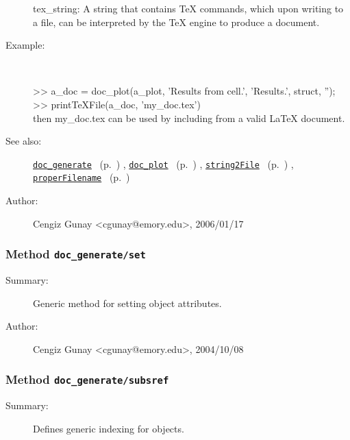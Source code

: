 \begin{description}
	tex\_string: A string that contains TeX commands, which upon writing to a file,
	  can be interpreted by the TeX engine to produce a document.
%
\item[Example:]~
\begin{lyxcode}        >> a\_doc = doc\_plot(a\_plot, 'Results from cell.', 'Results.', struct, ''); 
\\%
        >> printTeXFile(a\_doc, 'my\_doc.tex')
\\%
        then my\_doc.tex can be used by including from a valid LaTeX document.
\\%
\end{lyxcode}
%
\item[See also:]%
\hyperlink{ref_doc_generate}{\texttt{doc\_generate}}%
\ (p.~\pageref{ref_doc_generate})%
%
, \hyperlink{ref_doc_plot}{\texttt{doc\_plot}}%
\ (p.~\pageref{ref_doc_plot})%
%
, \hyperlink{ref_string2File}{\texttt{string2File}}%
\ (p.~\pageref{ref_string2File})%
%
, \hyperlink{ref_properFilename}{\texttt{properFilename}}%
\ (p.~\pageref{ref_properFilename})%
%
%
\item[Author:]%
Cengiz Gunay <cgunay@emory.edu>, 2006/01/17
%
\end{description}
\methodline%
\subsubsection[Method \texttt{set}]{Method \texttt{doc\_generate/set}}%
%
\label{ref_doc_generate__set}%
\hypertarget{ref_doc_generate__set}{}%
\begin{description}
\item[Summary:]Generic method for setting object attributes.
%
%
%
%
%
%
%
\item[Author:]%
Cengiz Gunay <cgunay@emory.edu>, 2004/10/08
%
\end{description}
\methodline%
\subsubsection[Method \texttt{subsref}]{Method \texttt{doc\_generate/subsref}}%
%
\label{ref_doc_generate__subsref}%
\hypertarget{ref_doc_generate__subsref}{}%
\begin{description}
\item[Summary:]Defines generic indexing for objects.
%
%
%
%
%
%
%
%
\end{description}
\methodline%
